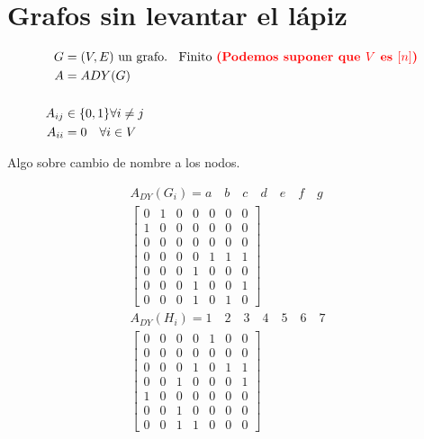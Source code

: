 \documentclass[../main.tex]{subfiles}
\begin{document}
\chapter{Grafos sin levantar el lápiz}%

\thispagestyle{fancy}

\begin{align*}
	G&=(V,E)\text{ un grafo. \dobledef{Finito}{Podemos suponer que $V$ es $[n]$}}\\
	A&=ADY(G)\\
	\\
	A_{ij}&\in\{0,1\} \forall i\neq j\\
	A_{ii}&= 0\quad\forall i \in V
\end{align*}

Algo sobre cambio de nombre a los nodos.

\begin{figure}[H]
	\centering
	
\end{figure}

\begin{figure}[H]
	\centering
	
\end{figure}

\begin{align*}
	A_{DY}(G_i)=
	a\quad
	b\quad
	c\quad
	d\quad
	e\quad
	f\quad
	g\quad\\
	\begin{bmatrix}
		0 & 1 & 0 & 0 & 0 & 0 & 0\\
		1 & 0 & 0 & 0 & 0 & 0 & 0\\
		0 & 0 & 0 & 0 & 0 & 0 & 0\\
		0 & 0 & 0 & 0 & 1 & 1 & 1\\
		0 & 0 & 0 & 1 & 0 & 0 & 0\\
		0 & 0 & 0 & 1 & 0 & 0 & 1\\
		0 & 0 & 0 & 1 & 0 & 1 & 0
	\end{bmatrix}\\
	A_{DY}(H_i)=
	1\quad
	2\quad
	3\quad
	4\quad
	5\quad
	6\quad
	7\quad\\
	\begin{bmatrix}
		0 & 0 & 0 & 0 & 1 & 0 & 0\\
		0 & 0 & 0 & 0 & 0 & 0 & 0\\
		0 & 0 & 0 & 1 & 0 & 1 & 1\\
		0 & 0 & 1 & 0 & 0 & 0 & 1\\
		1 & 0 & 0 & 0 & 0 & 0 & 0\\
		0 & 0 & 1 & 0 & 0 & 0 & 0\\
		0 & 0 & 1 & 1 & 0 & 0 & 0
	\end{bmatrix}
\end{align*}
\end{document}
